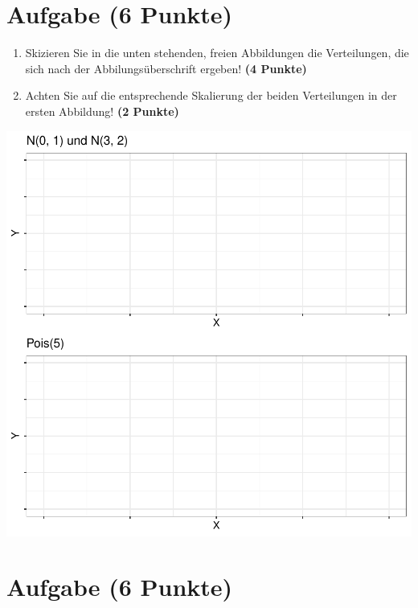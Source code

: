 \documentclass[a4paper, 10pt]{scrartcl}\usepackage[]{graphicx}\usepackage[]{xcolor}
\makeatletter
\def\maxwidth{ %
  \ifdim\Gin@nat@width>\linewidth
    \linewidth
  \else
    \Gin@nat@width
  \fi
}
\makeatother
\begin{document}
\section{Aufgabe \hfill (6 Punkte)}



\begin{enumerate}
\item Skizieren Sie in die unten stehenden, freien Abbildungen die
  Verteilungen, die sich nach der Abbilungs{\"u}berschrift ergeben! \textbf{(4
    Punkte)}
\item Achten Sie auf die entsprechende Skalierung der beiden Verteilungen
  in der ersten Abbildung! \textbf{(2 Punkte)}
\end{enumerate}



{\centering \includegraphics[width=\maxwidth]{img/histogram-01-1} 

}



 
\clearpage

\section{Aufgabe \hfill (6 Punkte)}
\end{document}

